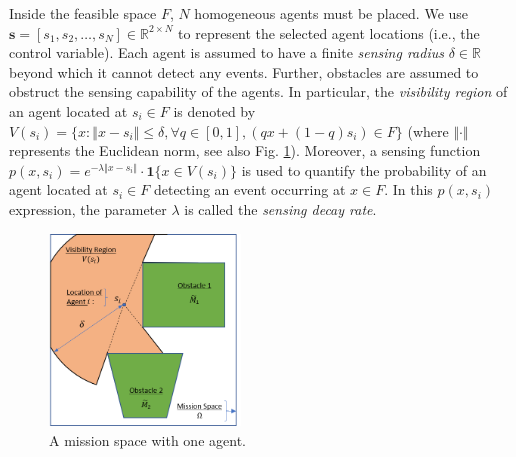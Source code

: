 \documentclass[conference]{IEEEtran}
\newcommand{\R}{\mathbb{R}}
\begin{document}
Inside the feasible space $F$, $N$ homogeneous agents must be placed. We use $\mathbf{s} = [s_1,s_2,\ldots,s_N] \in \R^{2\times N}$ to represent the selected agent locations (i.e., the control variable). Each agent is assumed to have a finite \emph{sensing radius} $\delta \in \R$ beyond which it cannot detect any events. Further, obstacles are assumed to obstruct the sensing capability of the agents. In particular, the \emph{visibility region} of an agent located at $s_i\in F$ is denoted by $V(s_i) = \{x:\Vert x - s_i\Vert \leq \delta, \forall q \in [0,1], (q x + (1-q)s_i)\in F \}$ (where $\Vert \cdot \Vert$ represents the Euclidean norm, see also Fig. \ref{Fig:Geometry}). Moreover, a sensing function $p(x,s_i)= e^{-\lambda\Vert x-s_i \Vert}\cdot \textbf{1}\{x\in V(s_i)\}$ is used to quantify the probability of an agent located at $s_i \in F$ detecting an event occurring at $x\in F$. In this $p(x,s_i)$ expression, the parameter $\lambda$ is called the \emph{sensing decay rate}. 

\begin{figure}[!h]
    \centering
    \includegraphics[width=2in]{Figures/Geometry.png}
    \caption{A mission space with one agent.}
    \label{Fig:Geometry}
\end{figure}
\end{document}
